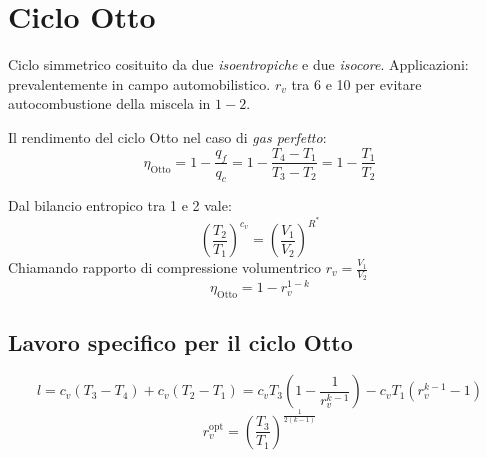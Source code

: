 \section{Ciclo Otto}
Ciclo simmetrico cosituito da due \emph{isoentropiche} e due \emph{isocore}.
Applicazioni: prevalentemente in campo automobilistico. $r_v$ tra 6 e 10 per evitare autocombustione della miscela in $1-2$.

\begin{minipage}{.5\linewidth}
\end{minipage}%
\begin{minipage}{.5\linewidth}
\end{minipage}

Il rendimento del ciclo Otto nel caso di \emph{gas perfetto}:
\[
    \eta_{\text{Otto}} = 1 - \frac{q_f}{q_c} = 1 - \frac{T_4-T_1}{T_3-T_2} = 1 - \frac{T_1}{T_2}
\]

Dal bilancio entropico tra 1 e 2 vale:
\[
    \left( \frac{T_2}{T_1} \right)^{c_v} = \left( \frac{V_1}{V_2} \right)^{R^*} 
\]
Chiamando rapporto di compressione volumentrico $r_v = \frac{V_1}{V_2}$
\[
    \eta_{\text{Otto}} = 1 - r_v^{1-k}
\]

\subsection{Lavoro specifico per il ciclo Otto}
\[
    l = c_v(T_3-T_4) + c_v(T_2-T_1) = c_vT_3\left(1-\frac{1}{r_v^{k-1}}\right) - c_vT_1(r_v^{k-1}-1)
\]
\[
    r_v^{\text{opt}} = \left(\frac{T_3}{T_1}\right)^{\frac{1}{2(k-1)}}
\]
